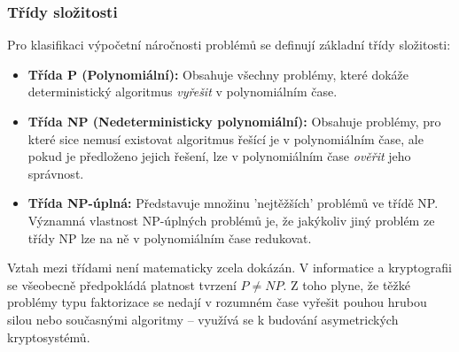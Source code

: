                 \subsubsection{Třídy složitosti}
                    Pro klasifikaci výpočetní náročnosti problémů se definují základní třídy složitosti:
                    \begin{itemize}
                        \item \textbf{Třída P (Polynomiální):} Obsahuje všechny problémy, které dokáže deterministický algoritmus \textit{vyřešit} v polynomiálním čase.
                        \item \textbf{Třída NP (Nedeterministicky polynomiální):} Obsahuje problémy, pro které sice nemusí existovat algoritmus řešící je v polynomiálním čase, ale pokud je předloženo jejich řešení, lze v polynomiálním čase \textit{ověřit} jeho správnost.
                        \item \textbf{Třída NP-úplná:} Představuje množinu 'nejtěžších' problémů ve třídě NP. Významná vlastnost NP-úplných problémů je, že jakýkoliv jiný problém ze třídy NP lze na ně v polynomiálním čase redukovat.
                    \end{itemize}
                    Vztah mezi třídami není matematicky zcela dokázán. V informatice a kryptografii se všeobecně předpokládá platnost tvrzení $P \neq NP$. Z toho plyne, že těžké problémy typu faktorizace se nedají v rozumném čase vyřešit pouhou hrubou silou nebo současnými algoritmy -- využívá se k budování asymetrických kryptosystémů.

